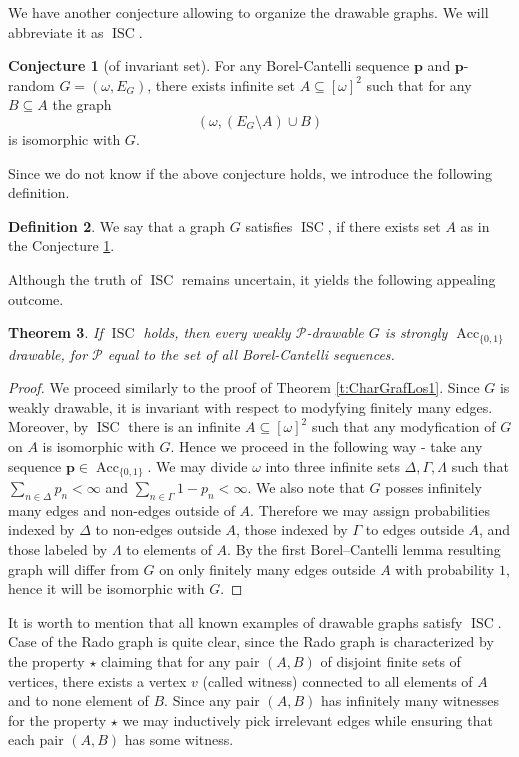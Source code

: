 \documentclass{amsart}
\newtheorem{theorem}{Theorem}[section]
\theoremstyle{plain}
\theoremstyle{definition}
\newtheorem{df}[theorem]{Definition}
\newtheorem{con}[theorem]{Conjecture}
\theoremstyle{remark}
\numberwithin{equation}{section}
\newcommand{\CIT}{\operatorname{ISC}}
\newcommand{\PP}{\mathcal{P}}
\DeclareMathOperator{\Acc}{Acc}
\begin{document}
We have another conjecture allowing to organize the drawable graphs. We will abbreviate it as $\CIT$. 
\begin{con}[of invariant set]\label{con:CIT} For any Borel-Cantelli sequence $\textbf{p}$ and $\textbf{p}$-random $G=(\omega,E_G)$, there exists infinite set $A\subseteq[\omega]^2$ such that for any $B\subseteq A$ the graph 
    \[
    \left(\omega, \left(E_G\setminus A\right)\cup B\right)
    \]
    is isomorphic with $G$.
\end{con}
    Since we do not know if the above conjecture holds, we introduce the following definition.
    \begin{df}
        We say that a graph $G$ satisfies $\CIT$, if there exists set $A$ as in the Conjecture \ref{con:CIT}.
    \end{df}
    Although the truth of $\CIT$ remains uncertain, it yields the following appealing outcome.
    \begin{theorem}
        If $\CIT$ holds, then every weakly $\PP$-drawable $G$ is strongly $\Acc_{\{0,1\}}$ drawable, for $\PP$ equal to the set of all Borel-Cantelli sequences.
    \end{theorem}
    \begin{proof}
        We proceed similarly to the proof of Theorem \ref{t:CharGrafLos1}. Since $G$ is weakly drawable, it is invariant with respect to modyfying finitely many edges. Moreover, by $\CIT$ there is an infinite $A\subseteq [\omega]^2$ such that any modyfication of $G$ on $A$ is isomorphic with $G$. Hence we proceed in the following way - take any sequence $\textbf{p}\in\Acc_{\{0,1\}}$.  We may divide $\omega$ into three infinite sets $\Delta,\Gamma, \Lambda$ such that $\sum\limits_{n\in\Delta} p_n<\infty$ and $\sum\limits_{n\in\Gamma} 1-p_n<\infty$. We also note that $G$ posses infinitely many edges and non-edges outside of $A$. Therefore we may assign probabilities indexed by $\Delta$ to non-edges outside $A$, those indexed by $\Gamma$ to edges outside $A$, and those labeled by $\Lambda$ to elements of $A$. By the first Borel--Cantelli lemma resulting graph will differ from $G$ on only finitely many edges outside $A$ with probability $1$, hence it will be isomorphic with $G$.  
    \end{proof}
It is worth to mention that all known examples of drawable graphs satisfy $\CIT $. Case of the Rado graph is quite clear, since the Rado graph is characterized by the property $\star$ claiming that for any pair $(A,B)$ of disjoint finite sets of vertices, there exists a vertex $v$ (called witness) connected to all elements of $A$ and to none element of $B$. Since any pair $(A,B)$ has infinitely many witnesses for the property $\star$ we may inductively pick irrelevant edges while ensuring that each pair $(A,B)$ has some witness.
\end{document}
